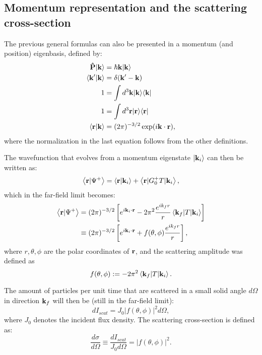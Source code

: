 \subsection{Momentum representation and the scattering cross-section}

The previous general formulas can also be presented in a momentum (and position) eigenbasis, defined by:
\begin{align*}
  \mathbf{\hat{P}}\vert \mathbf{k} \rangle & = \hbar \mathbf{k} \vert \mathbf{k} \rangle \\
  \left\langle \mathbf{k'} \vert \mathbf{k} \right\rangle & = \delta(\mathbf{k'}-\mathbf{k}) \\
  1 &= \int d^3\mathbf{k} \vert \mathbf{k} \rangle \langle \mathbf{k} \vert \\
  1 &= \int d^3\mathbf{r} \vert \mathbf{r} \rangle \langle \mathbf{r} \vert \\
  \left\langle \mathbf{r} \vert \mathbf{k} \right\rangle
  &= (2\pi)^{-3/2} \exp (i\mathbf{k}\cdot\mathbf{r}),
\end{align*}
where the normalization in the last equation follows from the other definitions.

The wavefunction that evolves from a momentum eigenstate $\vert \mathbf{k}_i \rangle$ can then be written as:
\begin{equation*}
  \left\langle \mathbf{r} \vert \Psi^+ \right\rangle = \left\langle \mathbf{r} \vert \mathbf{k}_i \right\rangle + \left\langle \mathbf{r} \vert G_0^+T \vert \mathbf{k}_i \right\rangle,
\end{equation*}
which in the far-field limit becomes:
\begin{align*}
  \left\langle \mathbf{r} \vert \Psi^+ \right\rangle
  &= (2\pi)^{-3/2}\left[ e^{i\mathbf{k}_i\cdot\mathbf{r}}
     - 2\pi^2\frac{e^{ik_f r}}{r} \left\langle \mathbf{k}_f \vert T \vert \mathbf{k}_i \right\rangle \right]  \\
  &\equiv (2\pi)^{-3/2}\left[ e^{i\mathbf{k}_i\cdot\mathbf{r}} + f(\theta,\phi)\frac{e^{ik_f r}}{r} \right],
\end{align*}
where $r,\theta,\phi$ are the polar coordinates of $\mathbf{r}$,
and the scattering amplitude was defined as
\begin{equation*}
  f(\theta, \phi) := -2\pi^2\left\langle \mathbf{k}_f \vert T \vert \mathbf{k}_i \right\rangle.
\end{equation*}

The amount of particles per unit time that are scattered in a small solid angle $d\Omega$ in direction $\mathbf{k}_f$ will then be (still in the far-field limit):
\begin{equation*}
  dI_{scat} = J_0\lvert f(\theta,\phi)\rvert^2d\Omega,
\end{equation*}
where $J_0$ denotes the incident flux density. The scattering cross-section is defined as:
\begin{equation*}
  \frac{d\sigma}{d\Omega}\equiv \frac{dI_{scat}}{J_0 d\Omega} = \lvert f(\theta,\phi) \rvert^2.
\end{equation*}

